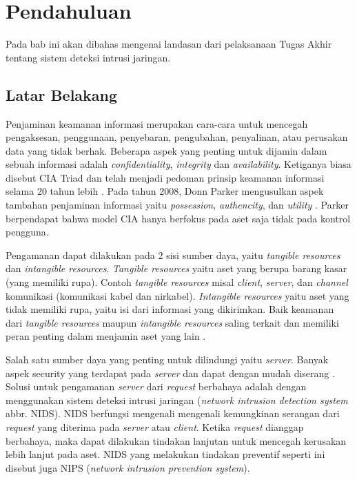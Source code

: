 \chapter{Pendahuluan}

  Pada bab ini akan dibahas mengenai landasan dari pelaksanaan Tugas Akhir tentang sistem deteksi intrusi jaringan.

\section{Latar Belakang}

  Penjaminan keamanan informasi merupakan cara-cara untuk mencegah pengaksesan, penggunaan, penyebaran, pengubahan, penyalinan, atau perusakan data yang tidak berhak. Beberapa aspek yang penting untuk dijamin dalam sebuah informasi adalah \emph{confidentiality}, \emph{integrity} dan \emph{availability}. Ketiganya biasa disebut CIA Triad dan telah menjadi pedoman prinsip keamanan informasi selama 20 tahun lebih \citep{nist2003}. Pada tahun 2008, Donn Parker mengusulkan aspek tambahan penjaminan informasi yaitu \emph{possession}, \emph{authencity}, dan \emph{utility} \citep{parker1998}. Parker berpendapat bahwa model CIA hanya berfokus pada aset saja tidak pada kontrol pengguna.

  Pengamanan dapat dilakukan pada 2 sisi sumber daya, yaitu \emph{tangible resources} dan \emph{intangible resources}. \emph{Tangible resources} yaitu aset yang berupa barang kasar (yang memiliki rupa). Contoh \emph{tangible resources} misal \emph{client}, \emph{server}, dan \emph{channel} komunikasi (komunikasi kabel dan nirkabel). \emph{Intangible resources} yaitu aset yang tidak memiliki rupa, yaitu isi dari informasi yang dikirimkan. Baik keamanan dari \emph{tangible resources} maupun \emph{intangible resources} saling terkait dan memiliki peran penting dalam menjamin aset yang lain \citep{kizza2015}.

  Salah satu sumber daya yang penting untuk dilindungi yaitu \emph{server}. Banyak aspek security yang terdapat pada \emph{server} dan dapat dengan mudah diserang \citep{owasp2013}. Solusi untuk pengamanan \emph{server} dari \emph{request} berbahaya adalah dengan menggunakan sistem deteksi intrusi jaringan (\emph{network intrusion detection system} abbr. NIDS). NIDS berfungsi mengenali mengenali kemungkinan serangan dari \emph{request} yang diterima pada \emph{server} atau \emph{client}. Ketika \emph{request} dianggap berbahaya, maka dapat dilakukan tindakan lanjutan untuk mencegah kerusakan lebih lanjut pada aset. NIDS yang melakukan tindakan preventif seperti ini disebut juga NIPS (\emph{network intrusion prevention system}).

